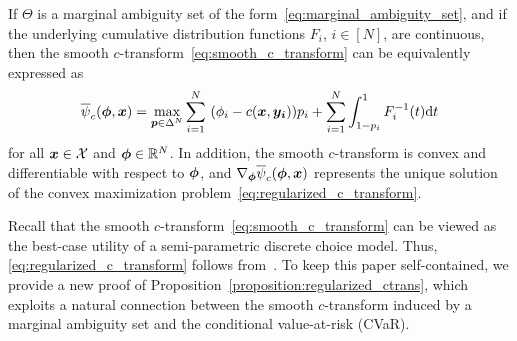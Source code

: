 \documentclass[11pt, a4paper, oneside, reqno]{article}
\begin{document}
	\begin{proposition}
		\label{proposition:regularized_ctrans}
		If $\Theta$ is a marginal ambiguity set of the form~\eqref{eq:marginal_ambiguity_set}, and if the underlying cumulative distribution functions $F_i$, $i\in[N]$, are continuous, then the smooth $c$-transform~\eqref{eq:smooth_c_transform} can be  equivalently expressed as
		\begin{equation}
		\label{eq:regularized_c_transform}
		\overline \psi_c(\boldsymbol \phi, \boldsymbol x) = \max_{ \boldsymbol p \in \Delta^N} \displaystyle \sum\limits_{i=1}^N ~ (\phi_i - c(\boldsymbol x, \boldsymbol {y_i}))p_i + \sum_{i=1}^N \int_{1-p_i}^1 F_i^{-1}(t) \mathrm{d} t
		\end{equation}
		for all $\bm x\in\mathcal{X}$ and $\bm \phi\in \mathbb{R}^N$. In addition, the smooth $c$-transform is convex and differentiable with respect to $\boldsymbol \phi$, and $\nabla_{\boldsymbol \phi} \overline\psi_c(\boldsymbol \phi, \boldsymbol x)$ represents the unique solution of the convex maximization problem~\eqref{eq:regularized_c_transform}.
	\end{proposition}
	Recall that the smooth $c$-transform~\eqref{eq:smooth_c_transform} can be viewed as the best-case utility of a semi-parametric discrete choice model. Thus, \eqref{eq:regularized_c_transform} follows from~\cite[Theorem~1]{natarajan2009persistency}.
	To keep this paper self-contained, we provide a new proof of Proposition~\ref{proposition:regularized_ctrans}, which exploits a natural connection between the smooth $c$-transform induced by a marginal ambiguity set and the conditional value-at-risk (CVaR). 
	
\end{document}
